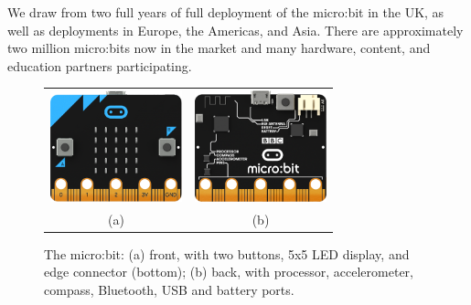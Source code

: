 We draw from two full years of
full deployment of the micro:bit in the UK, as well as deployments
in Europe, the Americas, and Asia.  There are approximately
two million micro:bits now in the market and many hardware,
content, and education partners participating.




\begin{figure}
  \begin{tabular}{cc}
    \includegraphics[width=1.5in]{images/microbit-front.png} &
    \includegraphics[width=1.5in]{images/microbit-back.png} \\
    (a) & (b)
  \end{tabular}
  \caption{\label{fig:microbit}The micro:bit: (a) front, with two buttons,
    5x5 LED display, and edge connector (bottom); (b) back, with processor, accelerometer, compass, Bluetooth, USB and battery ports.}
  \end{figure}

 